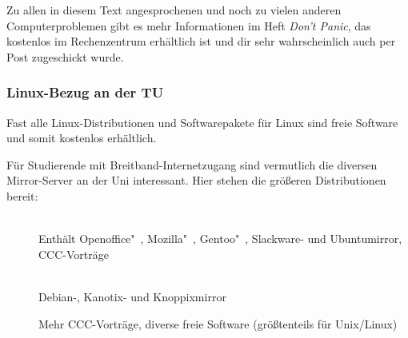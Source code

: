 		Zu allen in diesem Text angesprochenen und noch zu vielen anderen Computerproblemen gibt es mehr Informationen im Heft \emph{Don't Panic}, das kostenlos im Rechenzentrum erhältlich ist und dir sehr wahrscheinlich auch per Post zugeschickt wurde.

	\subsubsection{Linux-Bezug an der TU}
		Fast alle Linux-Distributionen und Softwarepakete für Linux sind freie Software und somit kostenlos erhältlich.

		Für Studierende mit Breitband-Internetzugang sind vermutlich die diversen Mirror-Server an der Uni interessant. Hier stehen die größeren Distributionen bereit:

		\begin{description}
			\item[]~\\Enthält Openoffice"~, Mozilla"~, Gentoo"~, Slackware- und Ubuntumirror, CCC-Vorträge
			\item[]~\\Debian-, Kanotix- und Knoppixmirror
			\item[] Mehr CCC-Vorträge, diverse freie Software (größtenteils für Unix/Linux)
		\end{description}

